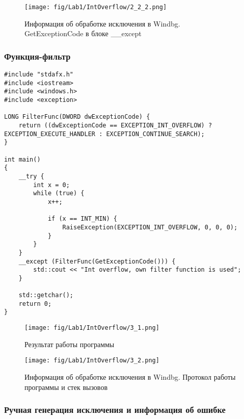 \begin{figure}[H]
    \begin{center}
        \texttt{[image: fig/Lab1/IntOverflow/2\_2\_2.png]}
        \caption{Информация об обработке исключения в Windbg. GetExceptionCode в блоке \_\_except}
        \label{pic:2_2_2}
    \end{center}
\end{figure}

\subsubsection{Функция-фильтр}
\begin{lstlisting}[caption=Реализия функции-фильтра]
#include "stdafx.h"
#include <iostream>
#include <windows.h>
#include <exception>

LONG FilterFunc(DWORD dwExceptionCode) {
    return ((dwExceptionCode == EXCEPTION_INT_OVERFLOW) ? EXCEPTION_EXECUTE_HANDLER : EXCEPTION_CONTINUE_SEARCH);
}

int main()
{
    __try {
        int x = 0;
        while (true) {
            x++;

            if (x == INT_MIN) {
                RaiseException(EXCEPTION_INT_OVERFLOW, 0, 0, 0);
            }
        }
    }
    __except (FilterFunc(GetExceptionCode())) {
        std::cout << "Int overflow, own filter function is used";
    }

    std::getchar();
    return 0;
}
\end{lstlisting}

\begin{figure}[H]
    \begin{center}
        \texttt{[image: fig/Lab1/IntOverflow/3\_1.png]}
        \caption{Результат работы программы}
        \label{pic:3_1}
    \end{center}
\end{figure}

\begin{figure}[H]
    \begin{center}
        \texttt{[image: fig/Lab1/IntOverflow/3\_2.png]}
        \caption{Информация об обработке исключения в Windbg. Протокол работы программы и стек вызовов}
        \label{pic:3_2_2}
    \end{center}
\end{figure}

\subsubsection{Ручная генерация исключения и информация об ошибке}

